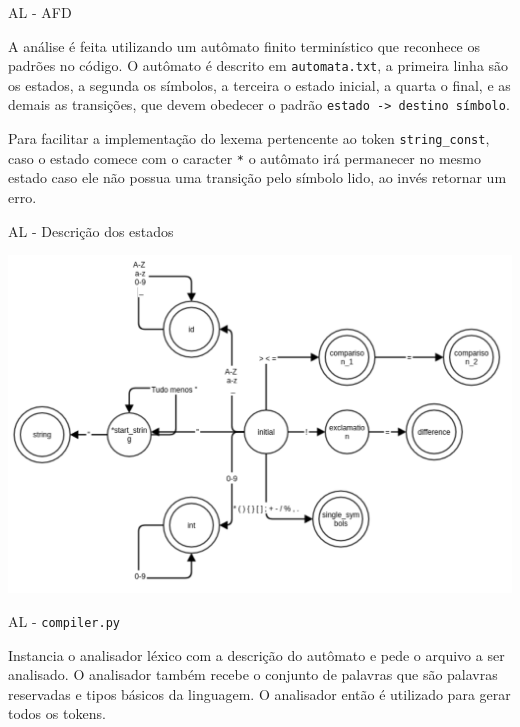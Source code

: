 \documentclass[10pt]{beamer}
\begin{document}
\begin{frame}{AL - AFD}

    A análise é feita utilizando um autômato finito terminístico que reconhece
    os padrões no código. O autômato é descrito em \texttt{automata.txt}, a 
    primeira linha são os estados, a segunda os símbolos, a terceira o estado
    inicial, a quarta o final, e as demais as transições, que devem obedecer o
    padrão \texttt{estado -> destino símbolo}.

    Para facilitar a implementação do lexema pertencente ao token
    \texttt{string\_const}, caso o estado comece com o caracter \texttt{*} o
    autômato irá permanecer no mesmo estado caso ele não possua uma transição
    pelo símbolo lido, ao invés retornar um erro.

\end{frame}

\begin{frame}{AL - Descrição dos estados}

    \includegraphics[width=\textwidth,height=\textheight,keepaspectratio]{automata_description.pdf}

\end{frame}

\begin{frame}{AL - \texttt{compiler.py}}

    Instancia o analisador léxico com a descrição do autômato e pede o arquivo
    a ser analisado. O analisador também recebe o conjunto de palavras que são
    palavras reservadas e tipos básicos da linguagem. O analisador então é
    utilizado para gerar todos os tokens.

\end{frame}
\end{document}

